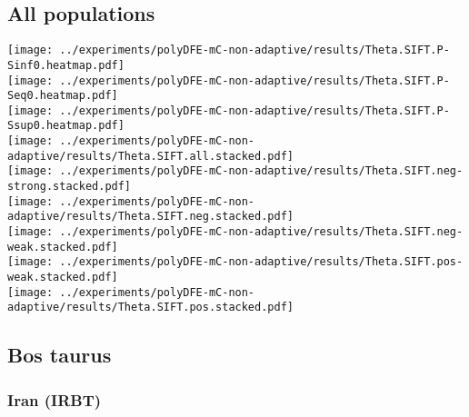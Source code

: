 \subsection{All populations}
\begin{center}
    \texttt{[image: ../experiments/polyDFE-mC-non-adaptive/results/Theta.SIFT.P-Sinf0.heatmap.pdf]} \\
    \texttt{[image: ../experiments/polyDFE-mC-non-adaptive/results/Theta.SIFT.P-Seq0.heatmap.pdf]} \\
    \texttt{[image: ../experiments/polyDFE-mC-non-adaptive/results/Theta.SIFT.P-Ssup0.heatmap.pdf]} \\
    \texttt{[image: ../experiments/polyDFE-mC-non-adaptive/results/Theta.SIFT.all.stacked.pdf]} \\
    \texttt{[image: ../experiments/polyDFE-mC-non-adaptive/results/Theta.SIFT.neg-strong.stacked.pdf]} \\
    \texttt{[image: ../experiments/polyDFE-mC-non-adaptive/results/Theta.SIFT.neg.stacked.pdf]} \\
    \texttt{[image: ../experiments/polyDFE-mC-non-adaptive/results/Theta.SIFT.neg-weak.stacked.pdf]} \\
    \texttt{[image: ../experiments/polyDFE-mC-non-adaptive/results/Theta.SIFT.pos-weak.stacked.pdf]} \\
    \texttt{[image: ../experiments/polyDFE-mC-non-adaptive/results/Theta.SIFT.pos.stacked.pdf]}
\end{center}

\subsection{Bos taurus}

\subsubsection{Iran (IRBT)}

